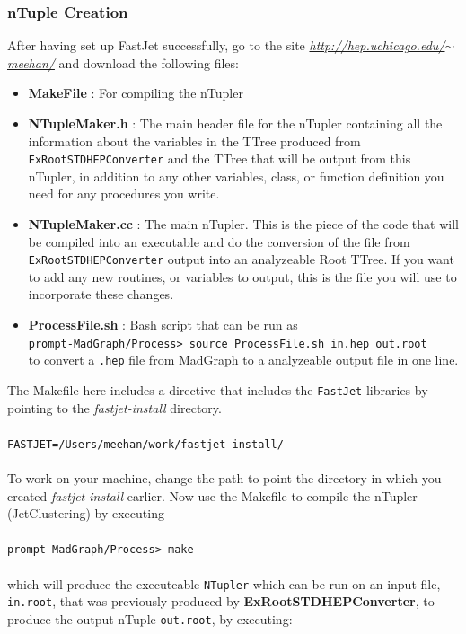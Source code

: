\documentclass[12pt]{article}
\begin{document}
\subsubsection{nTuple Creation}
After having set up FastJet successfully, go to the site \href{http://hep.uchicago.edu/~meehan/StandaloneAnalysisTutorial/}{\textit{http://hep.uchicago.edu/$\sim$meehan/}} and download the following files:
\begin{itemize}
\item \textbf{MakeFile} : For compiling the nTupler
\item \textbf{NTupleMaker.h} : The main header file for the nTupler containing all the information about the variables in the TTree produced from \texttt{ExRootSTDHEPConverter} and the TTree that will be output from this nTupler, in addition to any other variables, class, or function definition you need for any procedures you write.
\item \textbf{NTupleMaker.cc} : The main nTupler.  This is the piece of the code that will be compiled into an executable and do the conversion of the file from \texttt{ExRootSTDHEPConverter} output into an analyzeable Root TTree.  If you want to add any new routines, or variables to output, this is the file you will use to incorporate these changes.
\item \textbf{ProcessFile.sh} : Bash script that can be run as \\
					   \texttt{prompt-MadGraph/Process> source ProcessFile.sh in.hep out.root}\\
					   to convert a \texttt{.hep} file from MadGraph to a analyzeable output file in one line.
\end{itemize}
The Makefile here includes a directive that includes the \texttt{FastJet} libraries by pointing to the \textit{fastjet-install} directory.  \\
\\
\texttt{FASTJET=/Users/meehan/work/fastjet-install/}\\
\\
To work on your machine, change the path to point the directory in which you created \textit{fastjet-install} earlier.  Now use the Makefile to compile the nTupler (JetClustering) by executing\\ \\ 
 \texttt{prompt-MadGraph/Process> make}\\ \\
which will produce the executeable \texttt{NTupler} which can be run on an input file, \texttt{in.root}, that was previously produced by \textbf{ExRootSTDHEPConverter}, to produce the output nTuple \texttt{out.root}, by executing:\\ \\
\end{document}
